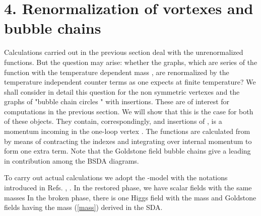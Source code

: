 \documentclass[a4paper,12pt]{article}
\begin{document}
\section*{4. Renormalization of  vortexes and  bubble chains}
Calculations carried out in the previous section deal with the
unrenormalized functions. But the question may arise: whether the
graphs, which are series of the \coordHE{} function
with the temperature dependent mass \coordHE{}, are renormalized by
the temperature independent counter terms as one expects at finite
temperature? We shall consider in detail this question for the non
symmetric vertexes \coordHE{} and the graphs \coordHE{} of
"bubble chain circles " with \coordHE{}  \coordHE{}
insertions. These are of interest for computations in the previous
section. We will show that this is the case for both of these
objects. They contain, correspondingly, \coordHE{} and \coordHE{} insertions of
\coordHE{}, \coordHE{} is a momentum incoming
in the one-loop vertex \coordHE{}. The
functions \coordHE{} are calculated from \coordHE{} by
means of contracting the indexes and integrating over internal
momentum to form one extra \coordHE{} term. Note that
the Goldstone field bubble chains give a leading in \coordHE{}
contribution among the BSDA diagrams.
 
To carry out actual calculations we adopt the \coordHE{}-model with the
notations introduced in Refs. \cite{prd}, \cite{pl}. In the restored
phase, we have \coordHE{} scalar fields with the same masses \coordHE{} In the
broken phase, there is one Higgs field \myHighlight{$\eta$}\coordHE{} with the mass \coordHE{}
and \coordHE{} Goldstone fields \myHighlight{$\phi$}\coordHE{} having the mass \coordHE{}
(\ref{mass}) derived in the SDA.
\end{document}
